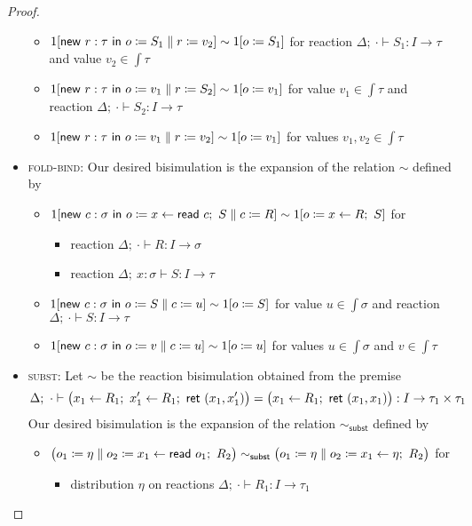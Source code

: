 \begin{proof}
\begin{itemize}
\begin{itemize}
\item $1[\mathsf{new} \ r : \tau \ \mathsf{in} \ o \coloneqq S_1 \; \| \; r \coloneqq v_2] \sim 1[o \coloneqq S_1]$ for reaction $\Delta; \ \cdot \vdash S_1 : I \to \tau$ and value $v_2 \in \int{\tau}$
\item $1[\mathsf{new} \ r : \tau \ \mathsf{in} \ o \coloneqq v_1 \; \| \; r \coloneqq S_2] \sim 1[o \coloneqq v_1]$ for value $v_1 \in \int{\tau}$ and reaction $\Delta; \ \cdot \vdash S_2 : I \to \tau$
\item $1[\mathsf{new} \ r : \tau \ \mathsf{in} \ o \coloneqq v_1 \; \| \; r \coloneqq v_2] \sim 1[o \coloneqq v_1]$ for values $v_1, v_2 \in \int{\tau}$
\end{itemize}
\item \textsc{fold-bind}: Our desired bisimulation is the expansion of the relation $\sim$ defined by
\begin{itemize}
\item $1[\mathsf{new} \ c : \sigma \ \mathsf{in} \ o \coloneqq x \leftarrow \mathsf{read} \ c; \ S \; \| \; c \coloneqq R] \sim 1[o \coloneqq x \leftarrow R; \ S]$ for
\begin{itemize}
\item reaction $\Delta; \ \cdot \vdash R : I \to \sigma$
\item reaction $\Delta; \ x : \sigma \vdash S : I \to \tau$
\end{itemize}
\item $1[\mathsf{new} \ c : \sigma \ \mathsf{in} \ o \coloneqq S \; \| \; c \coloneqq u] \sim 1[o \coloneqq S]$ for value $u \in \int{\sigma}$ and reaction $\Delta; \ \cdot \vdash S : I \to \tau$
\item $1[\mathsf{new} \ c : \sigma \ \mathsf{in} \ o \coloneqq v \; \| \; c \coloneqq u] \sim 1[o \coloneqq u]$ for values $u \in \int{\sigma}$ and $v \in \int{\tau}$
\end{itemize}
\item \textsc{subst}: Let $\sim$ be the reaction bisimulation obtained from the premise
\[\Delta; \ \cdot \vdash \big(x_1 \leftarrow R_1; \ x'_1 \leftarrow R_1; \ \ret{(x_1,x'_1)}\big) = \big(x_1 \leftarrow R_1; \ \ret{(x_1,x_1)}\big) : I \to \tau_1 \times \tau_1\]
Our desired bisimulation is the expansion of the relation $\sim_\mathsf{subst}$ defined by
\begin{itemize}
\item $\big(\Par{\assign{o_1}{\eta}}{\assign{o_2}{x_1 \leftarrow \read{o_1}; \ R_2}}\big) \sim_\mathsf{subst} \big(\Par{\assign{o_1}{\eta}}{\assign{o_2}{x_1 \leftarrow \eta; \ R_2}}\big)$ for
\begin{itemize}
\item distribution $\eta$ on reactions $\Delta; \ \cdot \vdash R_1 : I \to \tau_1$

\end{itemize}
\end{itemize}
\end{itemize}
\end{proof}
